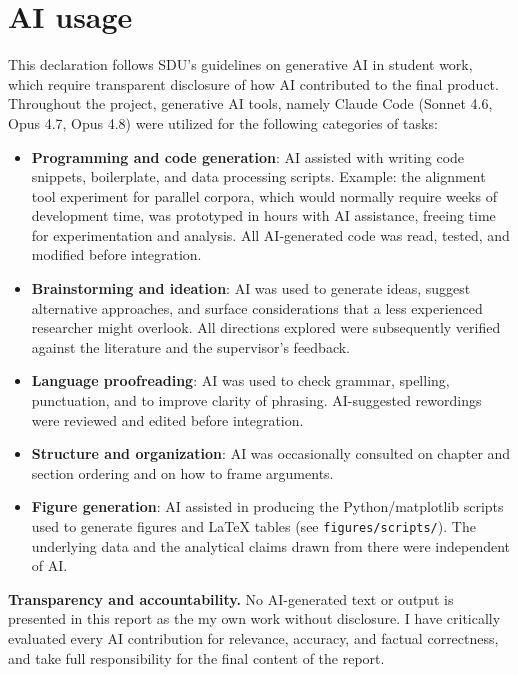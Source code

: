 \section{AI usage}

This declaration follows SDU's guidelines on generative AI in student work, which require transparent disclosure of how AI contributed to the final product. Throughout the project, generative AI tools, namely Claude Code (Sonnet 4.6, Opus 4.7, Opus 4.8) were utilized for the following categories of tasks:
\begin{itemize}
  \item \textbf{Programming and code generation}: AI assisted with writing code snippets, boilerplate, and data processing scripts. Example: the alignment tool experiment for parallel corpora, which would normally require weeks of development time, was prototyped in hours with AI assistance, freeing time for experimentation and analysis. All AI-generated code was read, tested, and modified before integration.
  \item \textbf{Brainstorming and ideation}: AI was used to generate ideas, suggest alternative approaches, and surface considerations that a less experienced researcher might overlook. All directions explored were subsequently verified against the literature and the supervisor's feedback.
  \item \textbf{Language proofreading}: AI was used to check grammar, spelling, punctuation, and to improve clarity of phrasing. AI-suggested rewordings were reviewed and edited before integration.
  \item \textbf{Structure and organization}: AI was occasionally consulted on chapter and section ordering and on how to frame arguments. 
  \item \textbf{Figure generation}: AI assisted in producing the Python/matplotlib scripts used to generate figures and LaTeX tables (see \texttt{figures/scripts/}). The underlying data and the analytical claims drawn from there were independent of AI.
\end{itemize}

\noindent\textbf{Transparency and accountability.} No AI-generated text or output is presented in this report as the my own work without disclosure. I have critically evaluated every AI contribution for relevance, accuracy, and factual correctness, and take full responsibility for the final content of the report.